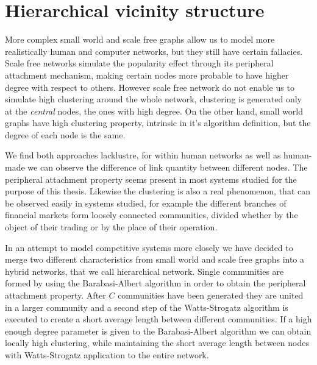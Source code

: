 \section{Hierarchical vicinity structure}
\label{sec:hierarchical vicinity}

More complex small world and scale free graphs allow us to model more realistically human and computer networks, but they still have certain fallacies.
Scale free networks simulate the popularity effect through its peripheral attachment mechanism, making certain nodes more probable to have higher degree with respect to others.
However scale free network do not enable us to simulate high clustering around the whole network, clustering is generated only at the \textit{central} nodes, the ones with high degree.
On the other hand, small world graphs have high clustering property, intrinsic in it's algorithm definition, but the degree of each node is the same.

We find both approaches lacklustre, for within human networks as well as human-made we can observe the difference of link quantity between different nodes.
The peripheral attachment property seems present in most systems studied for the purpose of this thesis.
Likewise the clustering is also a real phenomenon, that can be observed easily in systems studied, for example the different branches of financial markets form loosely connected communities, divided whether by the object of their trading or by the place of their operation.

In an attempt to model competitive systems more closely we have decided to merge two different characteristics from small world and scale free graphs into a hybrid networks, that we call hierarchical network.
Single communities are formed by using the Barabasi-Albert algorithm in order to obtain the peripheral attachment property.
After $C$ communities have been generated they are united in a larger community and a second step of the Watts-Strogatz algorithm is executed to create a short average length between different communities.
If a high enough degree parameter is given to the Barabasi-Albert algorithm we can obtain locally high clustering, while maintaining the short average length between nodes with Watts-Strogatz application to the entire network.

